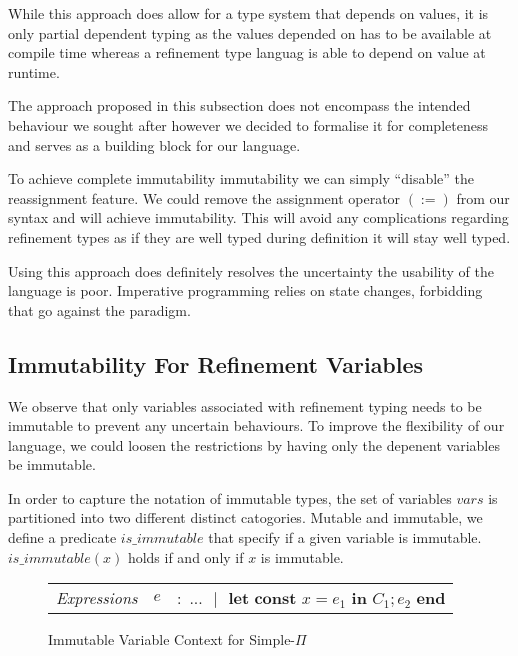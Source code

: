 \documentclass[a4paper,12pt]{report}
\begin{document}
\par
While this approach does allow for a type system that depends on values, it is 
only partial dependent typing as the values depended on has to be available at 
compile time whereas a refinement type languag is able to depend on 
value at runtime.

\par
The approach proposed in this subsection does not encompass the intended behaviour we 
sought after however we decided to formalise it for completeness and serves as 
a building block for our language. 

\par
To achieve complete immutability immutability we can simply ``disable'' the 
reassignment feature. We could remove the assignment operator $(:=)$ from our 
syntax and will achieve immutability. This will avoid any complications 
regarding refinement types as 
if they are well typed during definition it will stay well typed. 

\par
Using this approach does definitely resolves the uncertainty the usability of 
the language is poor. Imperative programming relies on state changes, forbidding 
that go against the paradigm. 

\subsection{Immutability For Refinement Variables}
We observe that only variables associated with refinement typing needs to be 
immutable to prevent any uncertain behaviours. To improve the flexibility of our 
language, we could loosen the restrictions by having only the depenent variables 
be immutable. 

\par
In order to capture the notation of immutable types, the set of variables $vars$ 
is partitioned into two different distinct catogories. Mutable and immutable, we 
define a predicate $is\_immutable$ that specify if a given variable is immutable. 
$is\_immutable(x)$ holds if and only if $x$ is immutable. 

\begin{figure}[H]
  \begin{center}
    \begin{tabular} {l l l}
      \textit{Expressions} & $e$& $:$ $...\text{ }|\text{ }
        \textbf{let const }x = e_1 \textbf{ in }C_1;e_2\textbf{ end}$
    \end{tabular}
  \end{center}
  \caption{Immutable Variable Context for Simple-$\Pi$}
\end{figure}
 
\end{document}

